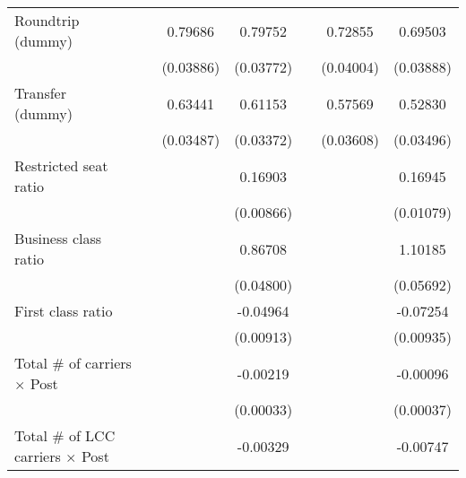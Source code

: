 \begin{table}[htbp]
\begin{tabular}{l*{6}{c}}
\addlinespace
\shortstack{Roundtrip \\ (dummy)}&                     &     0.79686\sym{***}&     0.79752\sym{***}&                     &     0.72855\sym{***}&     0.69503\sym{***}\\
                    &                     &   (0.03886)         &   (0.03772)         &                     &   (0.04004)         &   (0.03888)         \\
\addlinespace
\shortstack{Transfer \\ (dummy)}&                     &     0.63441\sym{***}&     0.61153\sym{***}&                     &     0.57569\sym{***}&     0.52830\sym{***}\\
                    &                     &   (0.03487)         &   (0.03372)         &                     &   (0.03608)         &   (0.03496)         \\
\addlinespace
Restricted seat ratio&                     &                     &     0.16903\sym{***}&                     &                     &     0.16945\sym{***}\\
                    &                     &                     &   (0.00866)         &                     &                     &   (0.01079)         \\
\addlinespace
Business class ratio&                     &                     &     0.86708\sym{***}&                     &                     &     1.10185\sym{***}\\
                    &                     &                     &   (0.04800)         &                     &                     &   (0.05692)         \\
\addlinespace
First class ratio   &                     &                     &    -0.04964\sym{***}&                     &                     &    -0.07254\sym{***}\\
                    &                     &                     &   (0.00913)         &                     &                     &   (0.00935)         \\
\addlinespace
Total # of carriers $\times$ Post&                     &                     &    -0.00219\sym{***}&                     &                     &    -0.00096\sym{***}\\
                    &                     &                     &   (0.00033)         &                     &                     &   (0.00037)         \\
\addlinespace
Total # of LCC carriers $\times$ Post&                     &                     &    -0.00329\sym{***}&                     &                     &    -0.00747\sym{***}\\

\end{tabular}
\end{table}

